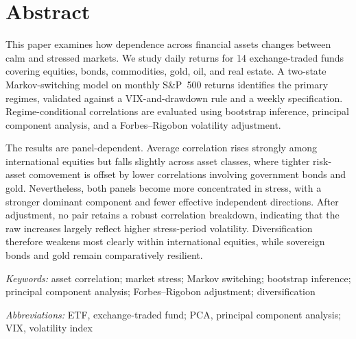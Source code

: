 
\section*{Abstract}

This paper examines how dependence across financial assets changes between calm and stressed markets. We study daily returns for 14 exchange-traded funds covering equities, bonds, commodities, gold, oil, and real estate. A two-state Markov-switching model on monthly S\&P~500 returns identifies the primary regimes, validated against a VIX-and-drawdown rule and a weekly specification. Regime-conditional correlations are evaluated using bootstrap inference, principal component analysis, and a Forbes--Rigobon volatility adjustment.

The results are panel-dependent. Average correlation rises strongly among international equities but falls slightly across asset classes, where tighter risk-asset comovement is offset by lower correlations involving government bonds and gold. Nevertheless, both panels become more concentrated in stress, with a stronger dominant component and fewer effective independent directions. After adjustment, no pair retains a robust correlation breakdown, indicating that the raw increases largely reflect higher stress-period volatility. Diversification therefore weakens most clearly within international equities, while sovereign bonds and gold remain comparatively resilient.

\noindent\textit{Keywords:} asset correlation; market stress; Markov switching; bootstrap inference; principal component analysis; Forbes--Rigobon adjustment; diversification

\noindent\textit{Abbreviations:} ETF, exchange-traded fund; PCA, principal component analysis; VIX, volatility index

\newpage
